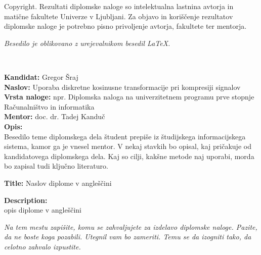 \documentclass[a4paper, 12pt]{book}
\newcommand{\clearemptydoublepage}{\newpage{\pagestyle{empty}\cleardoublepage}}
\begin{document}
\thispagestyle{empty}
\vspace*{8cm}

\noindent
{\sc Copyright}. 
Rezultati diplomske naloge so intelektualna lastnina avtorja in matične fakultete Univerze v Ljubljani.
Za objavo in koriščenje rezultatov diplomske naloge je potrebno pisno privoljenje avtorja, fakultete ter mentorja.

\begin{center}
\mbox{}\vfill
\emph{Besedilo je oblikovano z urejevalnikom besedil \LaTeX.}
\end{center}
\clearemptydoublepage

\thispagestyle{empty}
\
\vfill

\bigskip
\noindent\textbf{Kandidat:} Gregor Šraj\\
\noindent\textbf{Naslov:} Uporaba diskretne kosinusne transformacije pri kompresiji signalov\\
\noindent\textbf{Vrsta naloge:} npr. Diplomska naloga na univerzitetnem programu prve stopnje Računalništvo in informatika \\
\noindent\textbf{Mentor:} doc. dr. Tadej Kanduč\\

\bigskip
\noindent\textbf{Opis:}\\
Besedilo teme diplomskega dela študent prepiše iz študijskega informacijskega sistema, kamor ga je vnesel mentor. 
V nekaj stavkih bo opisal, kaj pričakuje od kandidatovega diplomskega dela. 
Kaj so cilji, kakšne metode naj uporabi, morda bo zapisal tudi ključno literaturo.

\bigskip
\noindent\textbf{Title:} Naslov diplome v angleščini

\bigskip
\noindent\textbf{Description:}\\
opis diplome v angleščini

\vfill



\vspace{2cm}

\clearemptydoublepage

\thispagestyle{empty}\mbox{}\vfill\null\it%
\noindent
Na tem mestu zapišite, komu se zahvaljujete za izdelavo diplomske naloge. Pazite, da ne boste koga pozabili. Utegnil vam bo zameriti. Temu se da izogniti tako, da celotno zahvalo izpustite.
\rm\normalfont
\end{document}
